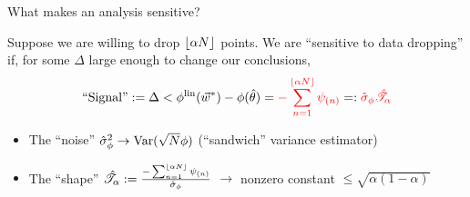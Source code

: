 





\begin{frame}{What makes an analysis sensitive?}

Suppose we are willing to drop $\lfloor \alpha N \rfloor$ points.
%
We are ``sensitive to data dropping'' if, for some $\Delta$ large enough to
change our conclusions,
%
\begin{align*}
%
\textrm{``Signal''} :=
\Delta < \thetafunlin(\w^*) - \thetafun(\thetahat)  =
    {\color{red}- \sum_{n=1}^{\lfloor \alpha N \rfloor} \infl_{(n)} }
    =:  {\color{red} \noise } { \color{red} \shape}
%
\end{align*}
%

\begin{itemize}
\item The ``noise'' $\hat\sigma_{\phi}^2 \rightarrow \mathrm{Var}(\sqrt{N}\phi)$
    (``sandwich'' variance estimator)
\item The ``shape''
    $\hat{\mathscr{T}}_\alpha := \frac{-\sum_{n=1}^{\lfloor \alpha N \rfloor} \psi_{(n)}}{\hat\sigma_{\phi}}$
    $\rightarrow$ nonzero constant
    $\le \sqrt{\alpha (1 - \alpha)}$
\end{itemize}

\begin{center}
\begin{minipage}{0.8\textwidth}
\end{minipage}
\end{center}




\end{frame}



